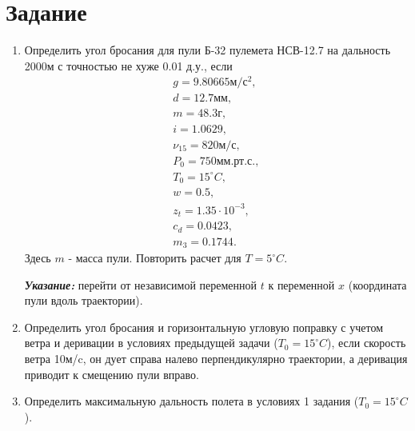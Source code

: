\documentclass{report}
\begin{document}
\section*{Задание}
\begin{enumerate}
\item Определить угол бросания для пули Б-32 пулемета НСВ-12.7 на дальность 2000м с точностью не хуже 0.01 д.у., если
\begin{equation} \nonumber
	\begin{split}
		g = 9.80665 \textit{м}/\textit{с}^2, \\
		d = 12.7 \textit{мм}, \\
		m = 48.3 \textit{г}, \\
		i = 1.0629, \\
		\nu_{15} = 820 \textit{м}/\textit{с}, \\
		P_0 = 750 \textit{мм.рт.с.}, \\
		T_0 = 15^\circ C, \\
		w = 0.5, \\
		z_t = 1.35 \cdot 10^{-3}, \\
		c_d = 0.0423, \\
		m_3 = 0.1744.
	\end{split}
\end{equation}
Здесь $m$ - масса пули. Повторить расчет для  $T = 5^\circ C$.

\textbf{\textit{Указание:}} перейти от независимой переменной $t$ к переменной $x$ (координата пули вдоль траектории).

\item Определить угол бросания и горизонтальную угловую поправку с учетом ветра и деривации в условиях предыдущей задачи ($T_0 = 15^\circ C$), если скорость ветра 10м/c, он дует справа налево перпендикулярно траектории, а деривация приводит к смещению пули вправо.

\item Определить максимальную дальность полета в условиях 1 задания ($T_0 = 15^\circ C$).
\end{enumerate}
\end{document}
